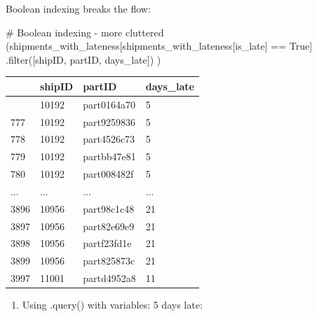 \documentclass[
  letterpaper,
  DIV=11,
  numbers=noendperiod]{scrartcl}
\newenvironment{Shaded}{\begin{snugshade}}{\end{snugshade}}
\newcommand{\BuiltInTok}[1]{\textcolor[rgb]{0.00,0.23,0.31}{#1}}
\newcommand{\CommentTok}[1]{\textcolor[rgb]{0.37,0.37,0.37}{#1}}
\newcommand{\NormalTok}[1]{\textcolor[rgb]{0.00,0.23,0.31}{#1}}
\newcommand{\OperatorTok}[1]{\textcolor[rgb]{0.37,0.37,0.37}{#1}}
\newcommand{\StringTok}[1]{\textcolor[rgb]{0.13,0.47,0.30}{#1}}
\newcommand{\VariableTok}[1]{\textcolor[rgb]{0.07,0.07,0.07}{#1}}
\providecommand{\tightlist}{%
  \setlength{\itemsep}{0pt}\setlength{\parskip}{0pt}}
\begin{document}
Boolean indexing breaks the flow:

\begin{Shaded}
\begin{Highlighting}[]
\CommentTok{\# Boolean indexing {-} more cluttered}
\NormalTok{(shipments\_with\_lateness[shipments\_with\_lateness[}\StringTok{\textquotesingle{}is\_late\textquotesingle{}}\NormalTok{] }\OperatorTok{==} \VariableTok{True}\NormalTok{]}
\NormalTok{    .}\BuiltInTok{filter}\NormalTok{([}\StringTok{\textquotesingle{}shipID\textquotesingle{}}\NormalTok{, }\StringTok{\textquotesingle{}partID\textquotesingle{}}\NormalTok{, }\StringTok{\textquotesingle{}days\_late\textquotesingle{}}\NormalTok{])}
\NormalTok{)}
\end{Highlighting}
\end{Shaded}

\begin{longtable}[]{@{}llll@{}}
\toprule\noalign{}
& shipID & partID & days\_late \\
\midrule\noalign{}
\endhead
\bottomrule\noalign{}
\endlastfoot
776 & 10192 & part0164a70 & 5 \\
777 & 10192 & part9259836 & 5 \\
778 & 10192 & part4526c73 & 5 \\
779 & 10192 & partbb47e81 & 5 \\
780 & 10192 & part008482f & 5 \\
... & ... & ... & ... \\
3896 & 10956 & part98c1c48 & 21 \\
3897 & 10956 & part82e69e9 & 21 \\
3898 & 10956 & partf23fd1e & 21 \\
3899 & 10956 & part825873c & 21 \\
3997 & 11001 & partd4952a8 & 11 \\
\end{longtable}

\begin{enumerate}
\def\labelenumi{\arabic{enumi}.}
\setcounter{enumi}{2}
\tightlist
\item
  Using .query() with variables: 5 days late:
\end{enumerate}
\end{document}
